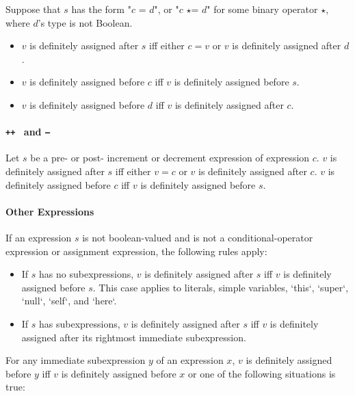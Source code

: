 Suppose that $s$ has the form 
\xcdmath"$c$ = $d$", or 
\xcdmath"$c$ $\star$= $d$" for some binary operator $\star$, where $d$'s type
is not Boolean.

\begin{itemize}
\item $v$ is definitely assigned after $s$ iff either $c=v$ or $v$ is
      definitely assigned after $d$.
\item $v$ is definitely assigned before $c$ iff $v$ is definitely assigned
      before $s$.
\item $v$ is definitely assigned before $d$ iff $v$ is definitely assigned
      after $c$.
\end{itemize}

\paragraph{{\tt ++ } and {\tt --}}

Let $s$ be a pre- or post- increment or decrement expression of expression $c$.
$v$ is definitely assigned after $s$ iff either $v=c$ or $v$ is definitely
assigned after $c$.  $v$ is definitely assigned before $c$ iff $v$ is
definitely assigned before $s$.

\paragraph{Other Expressions}

If an expression $s$ is not boolean-valued and is not a conditional-operator expression or assignment expression, the following rules apply:

\begin{itemize}
\item If $s$ has no subexpressions, $v$ is definitely assigned after $s$ iff
      $v$ is definitely assigned before $s$. This case applies to literals,
      simple variables, \xcd`this`, \xcd`super`, \xcd`null`, \xcd`self`, and
      \xcd`here`. 
\item 
If $s$ has subexpressions, $v$ is definitely assigned after $s$ iff $v$ is definitely assigned after its rightmost immediate subexpression. 
\end{itemize}

For any immediate subexpression $y$ of an expression $x$, $v$ is definitely assigned before $y$ iff $v$ is definitely assigned before $x$ or one of the following situations is true:

